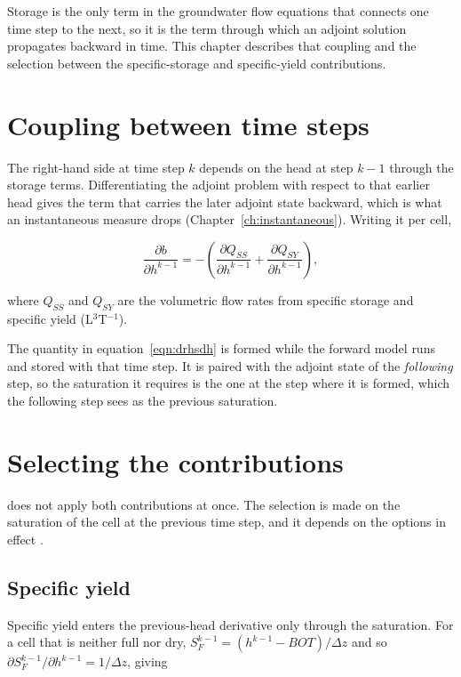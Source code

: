 Storage is the only term in the groundwater flow equations that connects one time step to the next, so it is the term through which an adjoint solution propagates backward in time. This chapter describes that coupling and the selection between the specific-storage and specific-yield contributions.

\section*{Coupling between time steps}

The right-hand side at time step $k$ depends on the head at step $k-1$ through the storage terms. Differentiating the adjoint problem with respect to that earlier head gives the term that carries the later adjoint state backward, which is what an instantaneous measure drops (Chapter~\ref{ch:instantaneous}). Writing it per cell,

\begin{equation}
	\label{eqn:drhsdh}
	\frac{\partial b}{\partial h^{k-1}} = -\left(
	\frac{\partial Q_{SS}}{\partial h^{k-1}} +
	\frac{\partial Q_{SY}}{\partial h^{k-1}} \right),
\end{equation}

\noindent where $Q_{SS}$ and $Q_{SY}$ are the volumetric flow rates from specific storage and specific yield (L$^{3}$T$^{-1}$).

The quantity in equation~\ref{eqn:drhsdh} is formed while the forward model runs and stored with that time step. It is paired with the adjoint state of the \emph{following} step, so the saturation it requires is the one at the step where it is formed, which the following step sees as the previous saturation.

\section*{Selecting the contributions}

\mf{} does not apply both contributions at once. The selection is made on the saturation of the cell at the previous time step, and it depends on the options in effect \citep{langevin2017}.

\subsection*{Specific yield}

Specific yield enters the previous-head derivative only through the saturation. For a cell that is neither full nor dry, $S_F^{k-1} = (h^{k-1} - BOT)/\Delta z$ and so $\partial S_F^{k-1} / \partial h^{k-1} = 1/\Delta z$, giving

